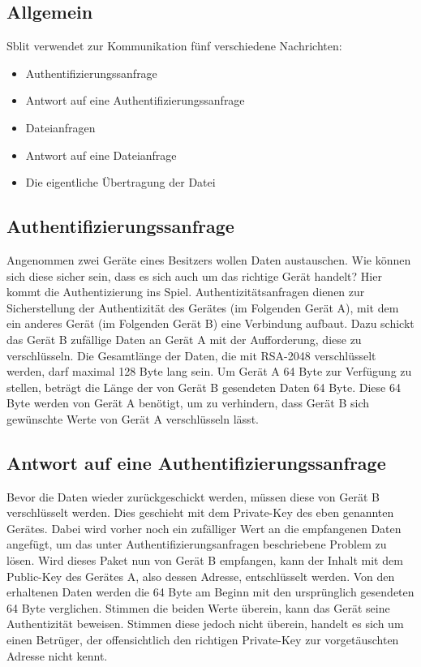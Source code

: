﻿\subsection{Allgemein}
Sblit verwendet zur Kommunikation fünf verschiedene Nachrichten:
\begin{itemize}
	\item Authentifizierungssanfrage
	\item Antwort auf eine Authentifizierungssanfrage
	\item Dateianfragen
	\item Antwort auf eine Dateianfrage
	\item Die eigentliche Übertragung der Datei
\end{itemize}
\subsection{Authentifizierungssanfrage}
Angenommen zwei Geräte eines Besitzers wollen Daten austauschen. Wie können sich diese sicher sein, dass es sich auch um das richtige Gerät handelt? Hier kommt die Authentizierung ins Spiel. Authentizitätsanfragen dienen zur Sicherstellung der Authentizität des Gerätes (im Folgenden Gerät A), mit dem ein anderes Gerät (im Folgenden Gerät B) eine Verbindung aufbaut. Dazu schickt das Gerät B zufällige Daten an Gerät A mit der Aufforderung, diese zu verschlüsseln. Die Gesamtlänge der Daten, die mit RSA-2048 verschlüsselt werden, darf maximal 128 Byte lang sein. Um Gerät A 64 Byte zur Verfügung zu stellen, beträgt die Länge der von Gerät B gesendeten Daten 64 Byte. Diese 64 Byte werden von Gerät A benötigt, um zu verhindern, dass Gerät B sich gewünschte Werte von Gerät A verschlüsseln lässt.

\subsection{Antwort auf eine Authentifizierungssanfrage}
Bevor die Daten wieder zurückgeschickt werden, müssen diese von Gerät B verschlüsselt werden. Dies geschieht mit dem Private-Key des eben genannten Gerätes. Dabei wird vorher noch ein zufälliger Wert an die empfangenen Daten angefügt, um das unter Authentifizierungsanfragen beschriebene Problem zu lösen.
Wird dieses Paket nun von Gerät B empfangen, kann der Inhalt mit dem Public-Key des Gerätes A, also dessen Adresse, entschlüsselt werden. Von den erhaltenen Daten werden die 64 Byte am Beginn mit den ursprünglich gesendeten 64 Byte verglichen. Stimmen die beiden Werte überein, kann das Gerät seine Authentizität beweisen. Stimmen diese jedoch nicht überein, handelt es sich um einen Betrüger, der offensichtlich den richtigen Private-Key zur vorgetäuschten Adresse nicht kennt.

